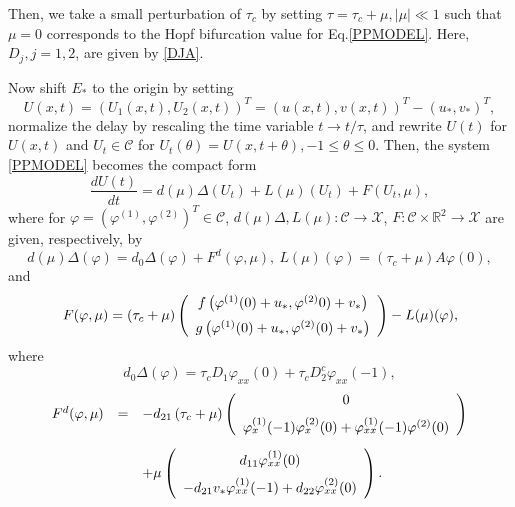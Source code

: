 \documentclass[11pt]{article}
\theoremstyle{definition}
\theoremstyle{remark}
\numberwithin{equation}{section}
\begin{document}
Then, we take a small perturbation of $\tau_c$ by setting $\tau=\tau_c+\mu, |\mu|\ll1$ such that $\mu=0$ corresponds to the Hopf bifurcation value for Eq.\eqref{PPMODEL}. Here, $D_j, j=1, 2$,  are given by \eqref{DJA}.

Now shift $E_*$ to the origin by setting
$$U(x,t)=\left(U_1(x,t),  U_2(x,t)\right)^T=(u(x,t), v(x,t))^T-(u_*, v_*)^T,$$
normalize the delay by rescaling the time variable $t\rightarrow t/\tau$, and rewrite $U(t)$ for $U(x, t)$ and $U_t\in \mathscr{C}$ for $U_t(\theta)=U(x, t+\theta), -1\leq \theta\leq 0$. Then, the system \eqref{PPMODEL} becomes the compact form
\begin{equation}
\label{NFEQ}
\frac{dU(t)}{dt}=d(\mu)\Delta (U_t)+L(\mu)(U_t)+F(U_t, \mu),
\end{equation}
where   for $\varphi=\left(\varphi^{(1)},\varphi^{(2)}\right)^T\in \mathscr{C}$,  $d(\mu)\Delta, L(\mu): \mathscr{C}\rightarrow \mathscr{X}$, $F: \mathscr{C}\times \mathbb{R}^2\rightarrow \mathscr{X}$  are given, respectively, by
$$d(\mu)\Delta (\varphi)=d_0\Delta (\varphi)+F^d (\varphi, \mu), ~L(\mu) (\varphi)=(\tau_c+\mu) A\varphi(0),$$
 and
\begin{equation}
\label{FPM}
  F(\varphi, \mu) = \left(\tau_c+\mu\right) \left(\begin{array}{c}
f\left(\varphi^{(1)}(0)+u_*, \varphi^{(2)}0)+v_*\right)\vspace{0.2cm}\\
g\left(\varphi^{(1)}(0)+u_*, \varphi^{(2)}(0)+v_*\right)\end{array}\right)-L(\mu)(\varphi),
\end{equation}
where
 $$
 d_0\Delta (\varphi)=\tau_cD_1\varphi_{xx}(0)+\tau_cD_2^c\varphi_{xx}(-1),
$$
\begin{equation}
\label{FD}
\begin{array}{lll}
F^d (\varphi, \mu)
&=&
-d_{21}\left(\tau_c+\mu\right)\left(\begin{array}{c}
0\vspace{0.2cm}\\
\varphi^{(1)}_{x}(-1)\varphi^{(2)}_{x}(0)+\varphi^{(1)}_{xx}(-1)\varphi^{(2)}(0)
\end{array}\right)\vspace{0.3cm}\\
&&
+\mu \left(\begin{array}{c}
d_{11}\varphi^{(1)}_{xx}(0)\vspace{0.2cm}\\
-d_{21} v_*\varphi^{(1)}_{xx}(-1) +d_{22}\varphi^{(2)}_{xx}(0)\end{array}\right).
\end{array}
 \end{equation}
\end{document}
